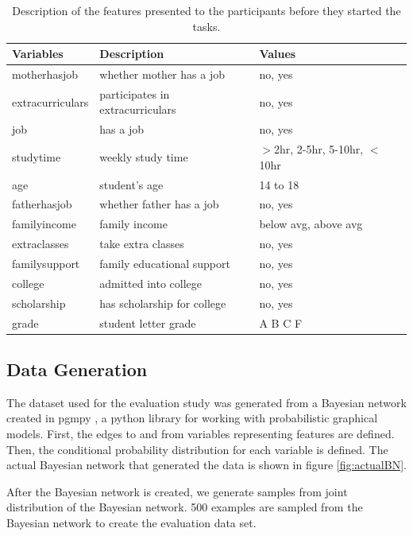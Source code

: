 \begin{table}[]
\centering
\begin{tabular}{lll}
\hline
Variables & Description & Values \\ \hline
motherhasjob & whether mother has a job & no, yes \\
extracurriculars& participates in extracurriculars & no, yes \\
job & has a job & no, yes \\
studytime & weekly study time & $>$2hr, 2-5hr, 5-10hr, $<$10hr \\
age & student's age & 14 to 18 \\
fatherhasjob & whether father has a job & no, yes \\
familyincome & family income & below avg, above avg \\
extraclasses & take extra classes & no, yes \\
familysupport & family educational support & no, yes \\
college & admitted into college & no, yes \\
scholarship & has scholarship for college & no, yes \\
grade & student letter grade & A B C F \\ \hline
\end{tabular}
\caption{Description of the features presented to the participants before they started the tasks.}
\label{featuredescription}
\end{table}

\subsection { Data Generation }
The dataset used for the evaluation study was generated from a Bayesian network created in pgmpy \cite{pgmpy}, a python library for working with probabilistic graphical models. First, the edges to and from variables representing features are defined. Then, the conditional probability distribution for each variable is defined. The actual Bayesian network that generated the data is shown in figure \ref{fig:actualBN}. 

After the Bayesian network is created, we generate samples from joint distribution of the Bayesian network. 500 examples are sampled from the Bayesian network to create the evaluation data set. 

